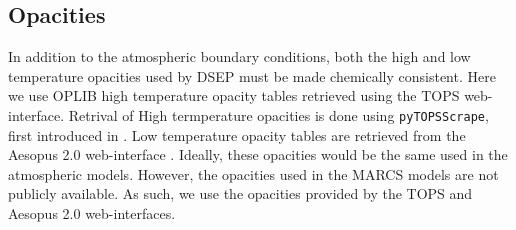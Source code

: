 \subsection{Opacities}\label{sec:opac}
In addition to the atmospheric boundary conditions, both the high and low
temperature opacities used by DSEP must be made chemically consistent. Here we
use OPLIB high temperature opacity tables \citep{Colgan2016} retrieved using
the TOPS web-interface. Retrival of High termperature opacities is done using
\texttt{pyTOPSScrape}, first introduced in \citet{Boudreaux2023}. Low
temperature opacity tables are retrieved from the Aesopus 2.0 web-interface
\citep{Marigo2009, Marigo2022}. Ideally, these opacities would be the same used
in the atmospheric models. However, the opacities used in the MARCS models are
not publicly available. As such, we use the opacities provided by the TOPS and
Aesopus 2.0 web-interfaces.
